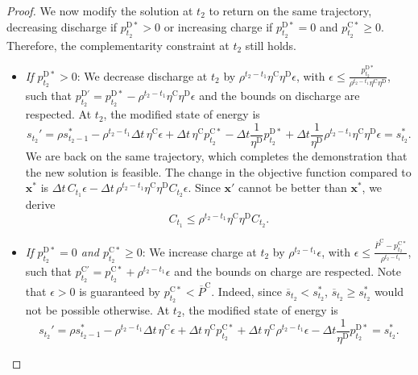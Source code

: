 \documentclass[10pt,a4paper]{amsart}
\newcommand{\up}[1]{^{\mathrm{#1}}}
\begin{document}
\begin{proof}
    We now modify the solution at $t_2$ to return on the same trajectory, decreasing discharge if $p\up{D*}_{t_2}>0$ or increasing charge if $p\up{D*}_{t_2}=0$ and $p\up{C*}_{t_2}\geq0$. Therefore, the complementarity constraint at $t_2$ still holds.

    \begin{itemize}
        \item \textit{If $p\up{D*}_{t_2}>0$}: We decrease discharge at $t_2$ by $\rho^{t_2 - t_1} \eta\up{C} \eta\up{D} \epsilon$, with ${\epsilon} \leq \frac{{p}\up{D*}_{t_2}}{\rho^{t_2 - t_1} \eta\up{C} \eta\up{D}} $, such that ${p}\up{D'}_{t_2}={p}\up{D*}_{t_2}-\rho^{t_2 - t_1} \eta\up{C} \eta\up{D} \epsilon$ and the bounds on discharge are respected. At $t_2$, the modified state of energy is
        \begin{equation}
            {s}_{t_2}' = \rho {s}_{t_2-1}^* - \rho^{t_2 - t_1} \Delta t \, \eta\up{C} {\epsilon} +\Delta t \, \eta\up{C} {p}\up{C*}_{t_2} - \Delta t \frac{1}{\eta\up{D}} {p}\up{D*}_{t_2} + \Delta t \frac{1}{\eta\up{D}} \rho^{t_2 - t_1} \eta\up{C} \eta\up{D} \epsilon = {s}_{t_2}^*.   
        \end{equation}
        We are back on the same trajectory, which completes the demonstration that the new solution is feasible.
        The change in the objective function compared to $\mathbf{x}^*$ is $\Delta t \, C_{t_1} \epsilon - \Delta t \, \rho^{t_2 - t_1} \eta\up{C} \eta\up{D} C_{t_2} \epsilon$. Since $\mathbf{x}'$ cannot be better than $\mathbf{x}^*$, we derive
        \begin{equation} \label{eq:star_pc_pd}
                C_{t_1} \leq \rho^{t_2 - t_1} \eta\up{C} \eta\up{D} C_{t_2}.
        \end{equation}
        \item \textit{If $p\up{D*}_{t_2}=0$ and $p\up{C*}_{t_2}\geq0$}: We increase charge at $t_2$ by $\rho^{t_2 - t_1} \epsilon$, with ${\epsilon} \leq \frac{\overline{P}\up{C} - p\up{C*}_{t_2}}{\rho^{t_2 - t_1}}$, such that ${p}\up{C'}_{t_2}={p}\up{C*}_{t_2}+\rho^{t_2 - t_1} \epsilon$ and the bounds on charge are respected.
        Note that ${\epsilon} >0$ is guaranteed by $p\up{C*}_{t_2} < \overline{P}\up{C}$. Indeed, since $\overline{s}_{t_2} < {s}_{t_2}^*$, $\overline{s}_{t_2} \geq {s}_{t_2}^*$ would not be possible otherwise.
        At $t_2$, the modified state of energy is
        \begin{equation}
            {s}_{t_2}' = \rho {s}_{t_2-1}^* - \rho^{t_2 - t_1} \Delta t \, \eta\up{C} {\epsilon} +\Delta t \, \eta\up{C} {p}\up{C*}_{t_2} +  \Delta t \, \eta\up{C} \rho^{t_2 - t_1} {\epsilon} - \Delta t \frac{1}{\eta\up{D}} {p}\up{D*}_{t_2} = {s}_{t_2}^*.

\end{equation}
\end{itemize}
\end{proof}
\end{document}
